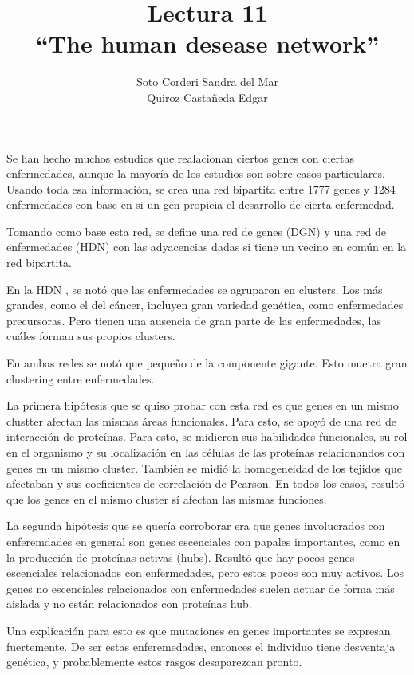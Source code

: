 \documentclass[12pt, letterpaper]{article}
\title{
    Lectura 11\\ 
    ``The human desease network''
}
\author{
    Soto Corderi Sandra del Mar\\
    Quiroz Castañeda Edgar \\
}
\begin{document}
    \maketitle
    
    Se han hecho muchos estudios que realacionan ciertos genes con ciertas 
    enfermedades, aunque la mayoría de los estudios son sobre casos 
    particulares.
    Usando toda esa información, se crea una red bipartita entre 1777 genes y 
    1284 enfermedades con base en si un gen propicia el desarrollo de cierta 
    enfermedad.

    Tomando como base esta red, se define una red de genes (DGN) y una red de 
    enfermedades (HDN) con las adyacencias dadas si tiene un vecino en común en
    la red bipartita.

    En la HDN , se notó que las enfermedades se agruparon en clusters. Los más 
    grandes, como el del cáncer, incluyen gran variedad genética, como 
    enfermedades precursoras. Pero tienen una ausencia de gran parte de las 
    enfermedades, las cuáles forman sus propios clusters.

    En ambas redes se notó que pequeño de la componente gigante. Esto muetra 
    gran clustering entre enfermedades.

    La primera hipótesis que se quiso probar con esta red es que genes en un
    mismo clustter afectan las mismas áreas funcionales. Para esto, se apoyó de 
    una red de interacción de proteínas. Para esto, se midieron sus habilidades
    funcionales, su rol en el organismo y su localización en las células de las
    proteínas relacionandos con genes en un mismo cluster. También se midió la 
    homogeneidad de los tejidos que afectaban y sus coeficientes de correlación
    de Pearson. En todos los casos, resultó que los genes en el mismo cluster sí
    afectan las mismas funciones.
    
    La segunda hipótesis que se quería corroborar era que genes involucrados con 
    enferemdades en general son genes escenciales con papales importantes, como
    en la producción de proteínas activas (hubs). Resultó que hay pocos genes 
    escenciales relacionados con enfermedades, pero estos pocos son muy activos.
    Los genes no escenciales relacionados con enfermedades suelen actuar de 
    forma más aislada y no están relacionados con proteínas hub.

    Una explicación para esto es que mutaciones en genes importantes se expresan
    fuertemente. De ser estas enferemedades, entonces el individuo tiene 
    desventaja genética, y probablemente estos rasgos desaparezcan pronto.
\end{document}
